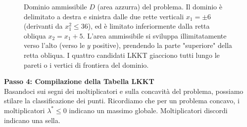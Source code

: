 \documentclass[12pt, a4paper]{article}
\begin{document}
	\begin{figure}[H]
		\centering
		\caption{Dominio ammissibile $D$ (area azzurra) del problema. Il dominio è delimitato a destra e sinistra dalle due rette verticali $x_1 = \pm 6$ (derivanti da $x_1^2 \le 36$), ed è limitato inferiormente dalla retta obliqua $x_2 = x_1 + 5$. L'area ammissibile si sviluppa illimitatamente verso l'alto (verso le $y$ positive), prendendo la parte "superiore" della retta obliqua. I quattro candidati LKKT giacciono tutti lungo le pareti o i vertici di frontiera del dominio.}
	\end{figure}
	
	\textbf{Passo 4: Compilazione della Tabella LKKT}\\
	Basandoci sui segni dei moltiplicatori e sulla concavità del problema, possiamo stilare la classificazione dei punti. Ricordiamo che per un problema concavo, i moltiplicatori $\lambda^* \le 0$ indicano un massimo globale. Moltiplicatori discordi indicano una sella.
	
\end{document}
